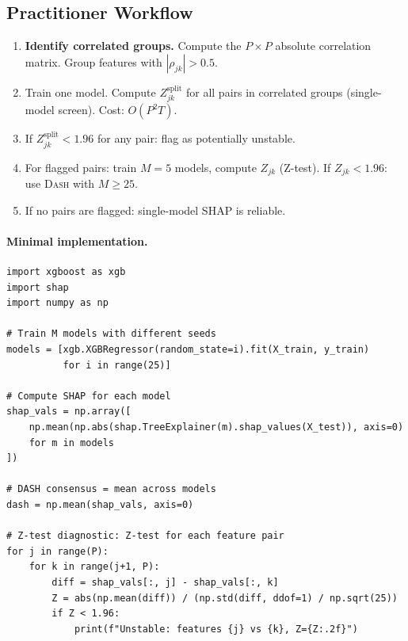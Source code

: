 \documentclass{article}
\newcommand{\DASH}{\textsc{Dash}}
\begin{document}
\subsection{Practitioner Workflow}
\label{sec:workflow}

\begin{enumerate}
    \item[\textbf{Step 0.}] \textbf{Identify correlated groups.} Compute the $P \times P$ absolute correlation matrix. Group features with $|\rho_{jk}| > 0.5$.
    \item[\textbf{Step 1.}] Train one model. Compute $Z^{\text{split}}_{jk}$ for all pairs in correlated groups (single-model screen). Cost: $O(P^2 T)$.
    \item[\textbf{Step 2.}] If $Z^{\text{split}}_{jk} < 1.96$ for any pair: flag as potentially unstable.
    \item[\textbf{Step 3.}] For flagged pairs: train $M = 5$ models, compute $Z_{jk}$ (Z-test). If $Z_{jk} < 1.96$: use \DASH{} with $M \geq 25$.
    \item[\textbf{Step 4.}] If no pairs are flagged: single-model SHAP is reliable.
\end{enumerate}

\paragraph{Minimal implementation.}
\begin{verbatim}
import xgboost as xgb
import shap
import numpy as np

# Train M models with different seeds
models = [xgb.XGBRegressor(random_state=i).fit(X_train, y_train)
          for i in range(25)]

# Compute SHAP for each model
shap_vals = np.array([
    np.mean(np.abs(shap.TreeExplainer(m).shap_values(X_test)), axis=0)
    for m in models
])

# DASH consensus = mean across models
dash = np.mean(shap_vals, axis=0)

# Z-test diagnostic: Z-test for each feature pair
for j in range(P):
    for k in range(j+1, P):
        diff = shap_vals[:, j] - shap_vals[:, k]
        Z = abs(np.mean(diff)) / (np.std(diff, ddof=1) / np.sqrt(25))
        if Z < 1.96:
            print(f"Unstable: features {j} vs {k}, Z={Z:.2f}")
\end{verbatim}
\end{document}
